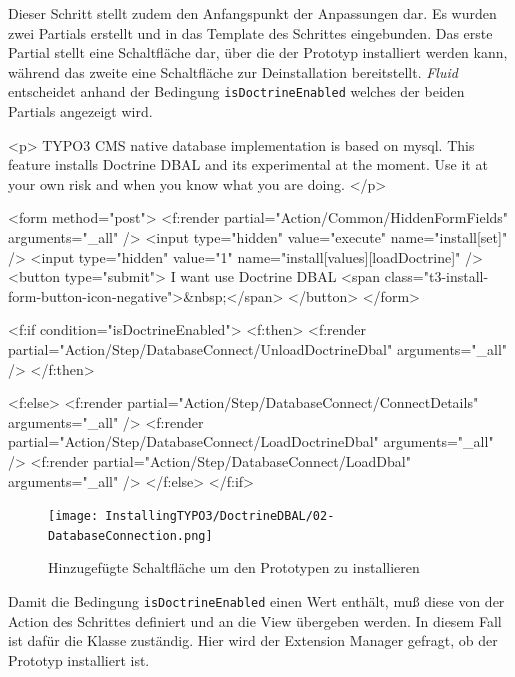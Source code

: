 {\begin{itemize}
Dieser Schritt stellt zudem den Anfangspunkt der Anpassungen dar. Es wurden zwei Partials erstellt und in das Template des Schrittes eingebunden. Das erste Partial stellt eine Schaltfläche dar, über die der Prototyp installiert werden kann, während das zweite eine Schaltfläche zur Deinstallation bereitstellt. \textit{Fluid} entscheidet anhand der Bedingung \texttt{isDoctrineEnabled} welches der beiden Partials angezeigt wird.
\end{itemize}

\begin{htmlcode}
<p>
TYPO3 CMS native database implementation is based on mysql. This feature
installs Doctrine DBAL and its experimental at the moment.
Use it at your own risk and when you know what you are doing.
</p>

<form method="post">
	<f:render partial="Action/Common/HiddenFormFields" arguments="{_all}" />
	<input type="hidden" value="execute" name="install[set]" />
	<input type="hidden" value="1" name="install[values][loadDoctrine]" />
	<button type="submit">
		I want use Doctrine DBAL
		<span class="t3-install-form-button-icon-negative">&nbsp;</span>
	</button>
</form>
\end{htmlcode}

\begin{htmlcode}
<f:if condition="{isDoctrineEnabled}">
	<f:then>
		<f:render partial="Action/Step/DatabaseConnect/UnloadDoctrineDbal" arguments="{_all}" />
	</f:then>

	<f:else>
		<f:render partial="Action/Step/DatabaseConnect/ConnectDetails" arguments="{_all}" />
		<f:render partial="Action/Step/DatabaseConnect/LoadDoctrineDbal" arguments="{_all}" />
		<f:render partial="Action/Step/DatabaseConnect/LoadDbal" arguments="{_all}" />
	</f:else>
</f:if>
\end{htmlcode}

\begin{figure}[H]
    \centering
    \texttt{[image: InstallingTYPO3/DoctrineDBAL/02-DatabaseConnection.png]}
    \caption{Hinzugefügte Schaltfläche um den Prototypen zu installieren}
    \label{fig:newDatabaseConnectionExtendsFromOldOne}
\end{figure}

Damit die Bedingung \texttt{isDoctrineEnabled} einen Wert enthält, muß diese von der Action des Schrittes definiert und an die View übergeben werden. In diesem Fall ist dafür die Klasse  zuständig. Hier wird der Extension Manager gefragt, ob der Prototyp installiert ist.

}
